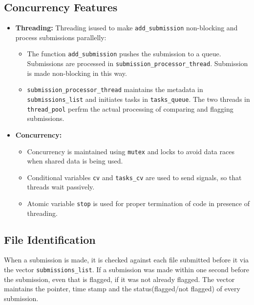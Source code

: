 \documentclass[12pt]{article}
\begin{document}
\subsection{Concurrency Features}
\begin{itemize}[noitemsep]
    \item \textbf{Threading:} Threading isused to make \texttt{add\_submission} non-blocking and process submissions parallelly:
    \begin{itemize}
        \item The function \texttt{add\_submission} pushes the submission to a queue. Submissions are processed in \texttt{submission\_processor\_thread}. Submission is made non-blocking in this way.
        \item \texttt{submission\_processor\_thread} maintains the metadata in \texttt{submissions\_list} and initiates tasks in \texttt{tasks\_queue}. The two threads in \texttt{thread\_pool} perfrm the actual processing of comparing and flagging submissions.
    \end{itemize}
    \item \textbf{Concurrency:} 
    \begin{itemize}
        \item Concurrency is maintained using \texttt{mutex} and locks to avoid data races when shared data is being used.
        \item Conditional variables \texttt{cv} and \texttt{tasks\_cv} are used to send signals, so that threads wait passively.
        \item  Atomic variable \texttt{stop} is used for proper termination of code in presence of threading.
    \end{itemize} 
\end{itemize}

\subsection{File Identification}
When a submission is made, it is checked against each file submitted before it via the vector \texttt{submissions\_list}. If a submission was made within one second before the submission, even that is flagged, if it was not already flagged. The vector maintains the pointer, time stamp and the status(flagged/not flagged) of every submission.
\end{document}
